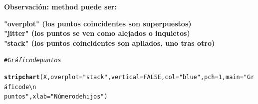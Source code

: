 \documentclass[12pt,letterpaper]{article}\usepackage[]{graphicx}\usepackage[]{color}
\makeatletter
\newcommand{\hlnum}[1]{\textcolor[rgb]{0.686,0.059,0.569}{#1}}%
\newcommand{\hlstr}[1]{\textcolor[rgb]{0.192,0.494,0.8}{#1}}%
\newcommand{\hlcom}[1]{\textcolor[rgb]{0.678,0.584,0.686}{\textit{#1}}}%
\newcommand{\hlstd}[1]{\textcolor[rgb]{0.345,0.345,0.345}{#1}}%
\newcommand{\hlkwc}[1]{\textcolor[rgb]{0.333,0.667,0.333}{#1}}%
\newcommand{\hlkwd}[1]{\textcolor[rgb]{0.737,0.353,0.396}{\textbf{#1}}}%
\newenvironment{kframe}{%
 \def\at@end@of@kframe{}%
 \ifinner\ifhmode%
  \def\at@end@of@kframe{\end{minipage}}%
  \begin{minipage}{\columnwidth}%
 \fi\fi%
 \def\FrameCommand##1{\hskip\@totalleftmargin \hskip-\fboxsep
 \colorbox{shadecolor}{##1}\hskip-\fboxsep
     \hskip-\linewidth \hskip-\@totalleftmargin \hskip\columnwidth}%
 \MakeFramed {\advance\hsize-\width
   \@totalleftmargin\z@ \linewidth\hsize
   \@setminipage}}%
 {\par\unskip\endMakeFramed%
 \at@end@of@kframe}
\newenvironment{knitrout}{}{} %
\makeatother
\begin{document}
\begin{enumerate}
\begin{knitrout}
\end{knitrout}

\textbf{Observaci\'on: method puede ser:} 

\textbf{"overplot" (los puntos coincidentes son superpuestos)}\\
\textbf{"jitter" (los puntos se ven como alejados o inquietos)}\\
\textbf{"stack" (los puntos coincidentes son apilados, uno tras otro)}\\

\begin{knitrout}
\color{fgcolor}\begin{kframe}
\begin{alltt}
\hlcom{# Gráfico de puntos}

\hlkwd{stripchart}\hlstd{(X,} \hlkwc{overplot}\hlstd{=}\hlstr{"stack"}\hlstd{,} \hlkwc{vertical}\hlstd{=}\hlnum{FALSE}\hlstd{,} \hlkwc{col}\hlstd{=}\hlstr{"blue"}\hlstd{,} \hlkwc{pch}\hlstd{=}\hlnum{1}\hlstd{,} \hlkwc{main}\hlstd{=}\hlstr{"Gráfico de\textbackslash{}n 
puntos"}\hlstd{,} \hlkwc{xlab}\hlstd{=}\hlstr{"Número de hijos"}\hlstd{)}
\end{alltt}


{\ttfamily\noindent{}}

{\ttfamily\noindent{}}

{\ttfamily\noindent{}}


\end{kframe}
\end{knitrout}
\end{enumerate}
\end{document}
